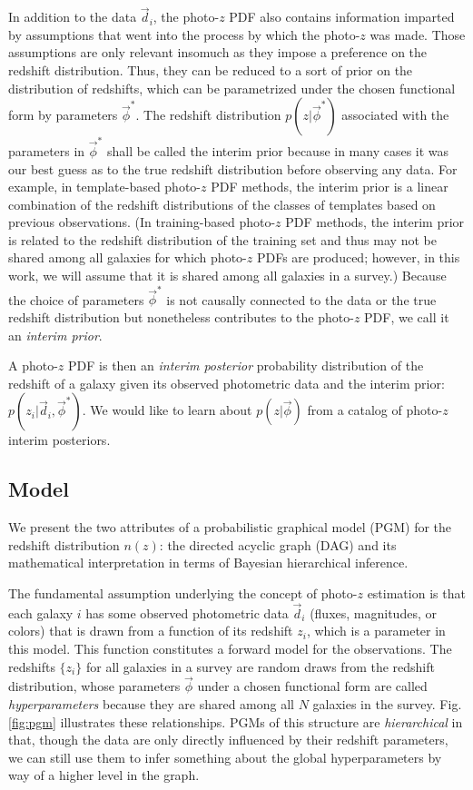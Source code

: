 \documentclass[iop]{emulateapj}
\begin{document}
In addition to the data $\vec{d}_{i}$, the photo-$z$ PDF also contains information imparted by assumptions that went into the process by which the photo-$z$ was made.  Those assumptions are only relevant insomuch as they impose a preference on the redshift distribution. Thus, they can be reduced to a sort of prior on the distribution of redshifts, which can be parametrized under the chosen functional form by parameters $\vec{\phi}^{*}$.  The redshift distribution $p(z | \vec{\phi}^{*})$ associated with the parameters in $\vec{\phi}^{*}$ shall be called the interim prior because in many cases it was our best guess as to the true redshift distribution before observing any data.  For example, in template-based photo-$z$ PDF methods, the interim prior is a linear combination of the redshift distributions of the classes of templates based on previous observations.  (In training-based photo-$z$ PDF methods, the interim prior is related to the redshift distribution of the training set and thus may not be shared among all galaxies for which photo-$z$ PDFs are produced; however, in this work, we will assume that it is shared among all galaxies in a survey.)  Because the choice of parameters $\vec{\phi}^{*}$ is not causally connected to the data or the true redshift distribution but nonetheless contributes to the photo-$z$ PDF, we call it an \textit{interim prior}.  

A photo-$z$ PDF is then an \textit{interim posterior} probability distribution of the redshift of a galaxy given its observed photometric data and the interim prior: $p(z_{i} | \vec{d}_{i}, \vec{\phi}^{*})$.  We would like to learn about $p(z | \vec{\phi})$ from a catalog of photo-$z$ interim posteriors.

\subsection{Model}
\label{sec:model}

We present the two attributes of a probabilistic graphical model (PGM) for the redshift distribution $n(z)$: the directed acyclic graph (DAG) and its mathematical interpretation in terms of Bayesian hierarchical inference.  

The fundamental assumption underlying the concept of photo-$z$ estimation is that each galaxy $i$ has some observed photometric data $\vec{d}_{i}$ (fluxes, magnitudes, or colors) that is drawn from a function of its redshift $z_{i}$, which is a parameter in this model.  This function constitutes a forward model for the observations.  The redshifts $\{z_{i}\}$ for all galaxies in a survey are random draws from the redshift distribution, whose parameters  $\vec{\phi}$ under a chosen functional form are called \textit{hyperparameters} because they are shared among all $N$ galaxies in the survey.  Fig. \ref{fig:pgm} illustrates these relationships.  PGMs of this structure are \textit{hierarchical} in that, though the data are only directly influenced by their redshift parameters, we can still use them to infer something about the global hyperparameters by way of a higher level in the graph.
\end{document}
